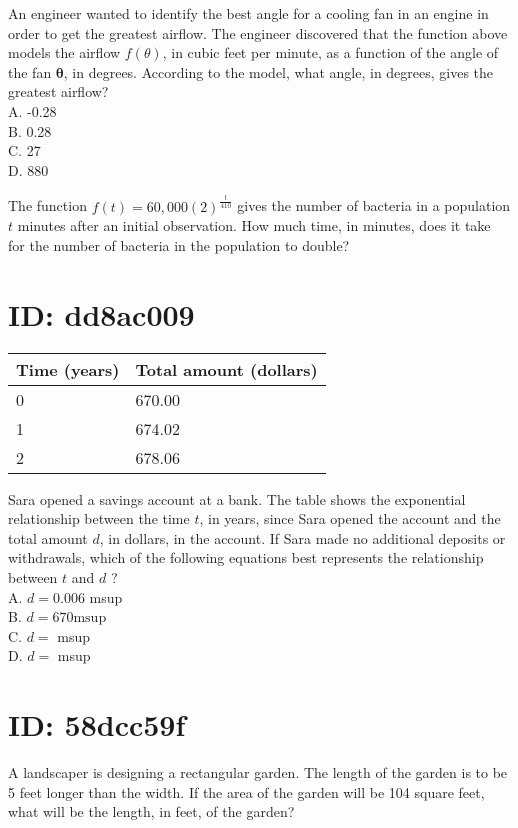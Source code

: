 An engineer wanted to identify the best angle for a cooling fan in an engine in order to get the greatest airflow. The engineer discovered that the function above models the airflow $f(\theta)$, in cubic feet per minute, as a function of the angle of the fan $\boldsymbol{\theta}$, in degrees. According to the model, what angle, in degrees, gives the greatest airflow?\\
A. -0.28\\
B. 0.28\\
C. 27\\
D. 880

The function $f(t)=60,000(2)^{\frac{t}{410}}$ gives the number of bacteria in a population $t$ minutes after an initial observation. How much time, in minutes, does it take for the number of bacteria in the population to double?

\section*{ID: dd8ac009}
\begin{center}
\begin{tabular}{|l|l|}
\hline
Time (years) & Total amount (dollars) \\
\hline
0 & 670.00 \\
\hline
1 & 674.02 \\
\hline
2 & 678.06 \\
\hline
\end{tabular}
\end{center}

Sara opened a savings account at a bank. The table shows the exponential relationship between the time $t$, in years, since Sara opened the account and the total amount $d$, in dollars, in the account. If Sara made no additional deposits or withdrawals, which of the following equations best represents the relationship between $t$ and $d$ ?\\
A. $d=0.006$ msup\\
B. $d=670 \mathrm{msup}$\\
C. $d=$ msup\\
D. $d=$ msup

\section*{ID: 58dcc59f}
A landscaper is designing a rectangular garden. The length of the garden is to be 5 feet longer than the width. If the area of the garden will be 104 square feet, what will be the length, in feet, of the garden?

